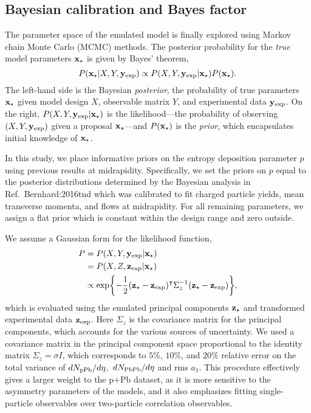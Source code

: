 \subsection{Bayesian calibration and Bayes factor}

The parameter space of the emulated model is finally explored using Markov chain Monte Carlo (MCMC) methods.
The posterior probability for the \emph{true} model parameters $\mathbf x_\star$ is given by Bayes' theorem,
\begin{equation}
  P(\mathbf x_\star| X, Y, \mathbf y_\text{exp}) \propto P(X, Y, \mathbf y_\text{exp} | \mathbf x_\star) P(\mathbf x_\star).
  \label{bayes}
\end{equation}
The left-hand side is the Bayesian \emph{posterior}, the probability of true parameters $\mathbf x_\star$ given model design $X$, observable matrix $Y$, and experimental data $\mathbf y_\text{exp}$.
On the right, $P(X, Y, \mathbf y_\text{exp}| \mathbf x_\star)$ is the likelihood---the probability of observing $(X, Y, \mathbf y_\text{exp})$ given a proposal $\mathbf x_\star$---and $P(\mathbf x_\star)$ is the \emph{prior}, which encapsulates initial knowledge of $\mathbf x_\star$.

In this study, we place informative priors on the entropy deposition parameter $p$ using previous results at midrapidity.
Specifically, we set the priors on $p$ equal to the posterior distributions determined by the Bayesian analysis in Ref.~{Bernhard:2016tnd} which was calibrated to fit charged particle yields, mean transverse momenta, and flows at midrapidity.
For all remaining parameters, we assign a flat prior which is constant within the design range and zero outside.

We assume a Gaussian form for the likelihood function,
\begin{align}
  \begin{aligned}
  P &= P(X, Y, \mathbf y_\text{exp}|\mathbf x_\star) \\
    &= P(X, Z, \mathbf z_\text{exp}|\mathbf x_\star) \\
    &\propto\exp\biggl\{-\frac{1}{2}(\mathbf z_\star - \mathbf z_\text{exp})^\intercal \Sigma_z^{-1}(\mathbf z_\star - \mathbf z_\text{exp})\biggr\},
  \end{aligned}
  \label{eq:likelihood}
\end{align}
which is evaluated using the emulated principal components $\mathbf z_\star$ and transformed experimental data $\mathbf z_\text{exp}$.
Here $\Sigma_z$ is the covariance matrix for the principal components, which accounts for the various sources of uncertainty. We used a covariance matrix in the principal component space proportional to the identity matrix $\Sigma_z = \sigma I$, which corresponds to $5\%$, $10\%$, and $20\%$ relative error on the total variance of $dN_\text{pPb}/d\eta$,\, $dN_\text{PbPb}/d\eta$ and rms $a_1$.
This procedure effectively gives a larger weight to the p+Pb dataset, as it is more sensitive to the asymmetry parameters of the models, and it also emphasizes fitting single-particle observables over two-particle correlation observables.

